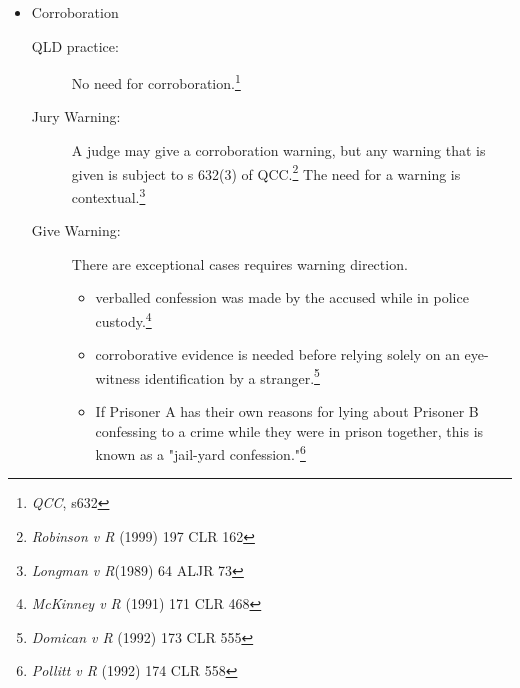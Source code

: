 \begin{itemize}
	\item Corroboration
		\begin{description}
			\item[QLD practice:] No need for corroboration.\footnote{\textit{QCC}, s632}
			\item[Jury Warning:] A judge may give a corroboration warning, but any warning that is given is subject to s 632(3) of QCC.\footnote{\textit{Robinson v R }(1999) 197 CLR 162} The need for a warning is contextual.\footnote{\textit{Longman v R}(1989) 64 ALJR 73}
			\item[Give Warning:] There are exceptional cases requires warning direction. 
				\begin{itemize}
				\item verballed confession was made by the accused while in police custody.\footnote{\textit{McKinney v R }(1991) 171 CLR 468}
				\item corroborative evidence is needed before relying solely on an eye-witness identification by a stranger.\footnote{\textit{Domican v R }(1992) 173 CLR 555}
				\item If Prisoner A has their own reasons for lying about Prisoner B confessing to a crime while they were in prison together, this is known as a "jail-yard confession."\footnote{\textit{Pollitt v R} (1992) 174 CLR 558} 
				\end{itemize}
		\end{description}
\end{itemize}